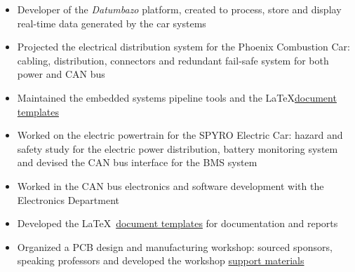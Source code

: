 \documentclass[10pt,a4paper,ragged2e,withhyper]{altacv}
\begin{document}
\begin{paracol}{2}

\begin{itemize}
  \item Developer of the \textit{Datumbazo} platform, created to process, store and display real-time data generated by the car systems
  \item Projected the electrical distribution system for the Phoenix Combustion Car: cabling, distribution, connectors and redundant fail-safe system for both power and CAN bus
  \item Maintained the embedded systems pipeline tools and the \LaTeX \linebreak \href{https://github.com/engeniusua/engenius-ua-latex-template}{document templates}
\end{itemize}

\divider

\begin{itemize}
  \item Worked on the electric powertrain for the SPYRO Electric Car: hazard and safety study for the electric power distribution, battery monitoring system and devised the CAN bus interface for the BMS system
  \item Worked in the CAN bus electronics and software development with the Electronics Department
  \item Developed the \LaTeX\ \href{https://github.com/engeniusua/engenius-ua-latex-template}{document templates} for documentation and reports
\end{itemize}

\divider

\begin{itemize}
  \item Organized a PCB design and manufacturing workshop: sourced sponsors, speaking professors and developed the workshop \href{https://github.com/dvcorreia/ac2-detpic-pcb-shield}{support materials}
\end{itemize}


\end{paracol}
\end{document}
